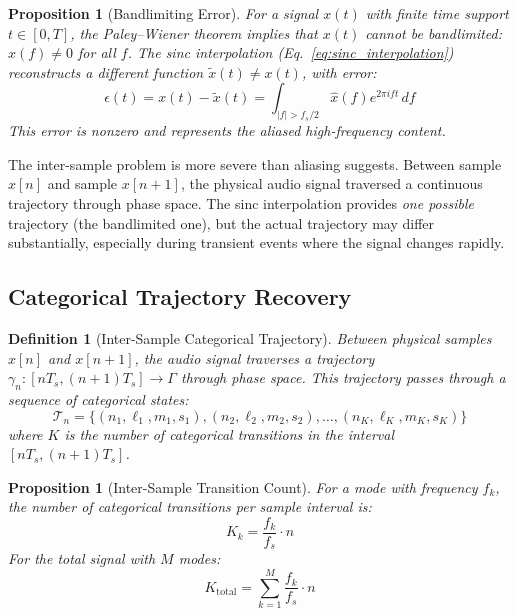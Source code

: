 \documentclass[twocolumn,10pt]{article}
\newtheorem{proposition}[theorem]{Proposition}
\newtheorem{definition}[theorem]{Definition}
\theoremstyle{remark}
\newcommand{\calT}{\mathcal{T}}
\begin{document}
\begin{proposition}[Bandlimiting Error]
\label{prop:bandlimit_error}
For a signal $x(t)$ with finite time support $t \in [0, T]$, the Paley--Wiener theorem \cite{rudin1987} implies that $x(t)$ cannot be bandlimited: $\hat{x}(f) \neq 0$ for all $f$. The sinc interpolation (Eq.~\ref{eq:sinc_interpolation}) reconstructs a different function $\tilde{x}(t) \neq x(t)$, with error:
\begin{equation}
    \epsilon(t) = x(t) - \tilde{x}(t) = \int_{|f| > f_s/2} \hat{x}(f) e^{2\pi i f t} \, df
    \label{eq:aliasing_error}
\end{equation}
This error is nonzero and represents the aliased high-frequency content.
\end{proposition}

The inter-sample problem is more severe than aliasing suggests. Between sample $x[n]$ and sample $x[n+1]$, the physical audio signal traversed a continuous trajectory through phase space. The sinc interpolation provides \textit{one possible} trajectory (the bandlimited one), but the actual trajectory may differ substantially, especially during transient events where the signal changes rapidly.

\subsection{Categorical Trajectory Recovery}

\begin{definition}[Inter-Sample Categorical Trajectory]
\label{def:intersample_trajectory}
Between physical samples $x[n]$ and $x[n+1]$, the audio signal traverses a trajectory $\gamma_n: [nT_s, (n+1)T_s] \to \Gamma$ through phase space. This trajectory passes through a sequence of categorical states:
\begin{equation}
    \calT_n = \{(n_1, \ell_1, m_1, s_1), (n_2, \ell_2, m_2, s_2), \ldots, (n_K, \ell_K, m_K, s_K)\}
    \label{eq:categorical_trajectory}
\end{equation}
where $K$ is the number of categorical transitions in the interval $[nT_s, (n+1)T_s]$.
\end{definition}

\begin{proposition}[Inter-Sample Transition Count]
\label{prop:transition_count}
For a mode with frequency $f_k$, the number of categorical transitions per sample interval is:
\begin{equation}
    K_k = \frac{f_k}{f_s} \cdot n
    \label{eq:transitions_per_sample}
\end{equation}
For the total signal with $M$ modes:
\begin{equation}
    K_{\mathrm{total}} = \sum_{k=1}^{M} \frac{f_k}{f_s} \cdot n
    \label{eq:total_transitions}
\end{equation}
\end{proposition}
\end{document}
